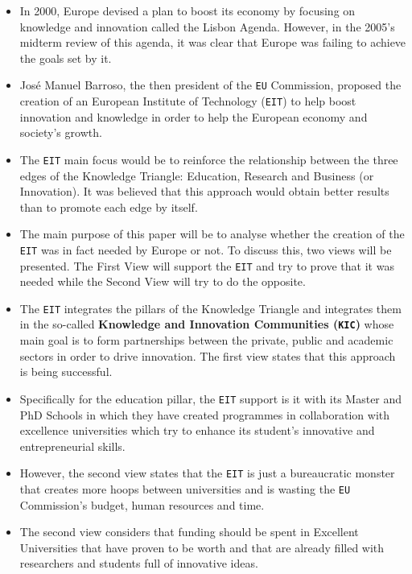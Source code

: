 \documentclass[11pt,a4paper,oneside,twocolumn]{IEEEtran}
\begin{document}
\begin{itemize}
    \item In 2000, Europe devised a plan to boost its economy by focusing on knowledge and innovation called the Lisbon Agenda. However, in the 2005's midterm review of this agenda, it was clear that Europe was failing to achieve the goals set by it.
    \item Jos\'e Manuel Barroso, the then president of the \texttt{EU} Commission, proposed the creation of an European Institute of Technology (\texttt{EIT}) to help boost innovation and knowledge in order to help the European economy and society's growth.
    \item The \texttt{EIT} main focus would be to reinforce the relationship between the three edges of the Knowledge Triangle: Education, Research and Business (or Innovation). It was believed that this approach would obtain better results than to promote each edge by itself.
    \item The main purpose of this paper will be to analyse whether the creation of the \texttt{EIT} was in fact needed by Europe or not. To discuss this, two views will be presented. The First View will support the \texttt{EIT} and try to prove that it was needed while the Second View will try to do the opposite.
    \item The \texttt{EIT} integrates the pillars of the Knowledge Triangle and integrates them in the so-called \textbf{Knowledge and Innovation Communities (\texttt{KIC})} whose main goal is to form partnerships between the private, public and academic sectors in order to drive innovation. The first view states that this approach is being successful.
    \item Specifically for the education pillar, the \texttt{EIT} support is it with its Master and PhD Schools in which they have created programmes in collaboration with excellence universities which try to enhance its student's innovative and entrepreneurial skills.
    \item However, the second view states that the \texttt{EIT} is just a bureaucratic monster that creates more hoops between universities and is wasting the \texttt{EU} Commission's budget, human resources and time.
    \item The second view considers that funding should be spent in Excellent Universities that have proven to be worth and that are already filled with researchers and students full of innovative ideas.
\end{itemize}
\end{document}
